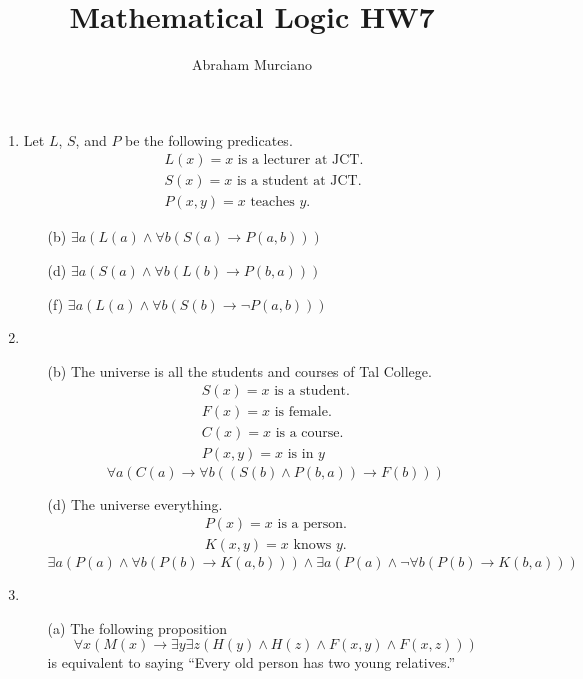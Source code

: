 \documentclass[fleqn]{article}
\title{Mathematical Logic HW7}
\author{Abraham Murciano}
\begin{document}
\maketitle

\begin{enumerate}

	\item %
	Let \(L\), \(S\), and \(P\) be the following predicates.
	\begin{gather*}
		L(x) = x \text{ is a lecturer at JCT.} \\
		S(x) = x \text{ is a student at JCT.} \\
		P(x, y) = x \text{ teaches \(y\).}
	\end{gather*}
	\begin{enumerate}
		\item[(b)]
		\(\exists a (L(a) \land \forall b (S(a) \to P(a, b)))\)

		\item[(d)]
		\(\exists a (S(a) \land \forall b (L(b) \to P(b, a)))\)

		\item[(f)]
		\(\exists a (L(a) \land \forall b (S(b) \to \lnot P(a, b)))\)
	\end{enumerate}

	\item %
	\begin{enumerate}
		\item[(b)]
		The universe is all the students and courses of Tal College.
		\begin{gather*}
			S(x) = x \text{ is a student.} \\
			F(x) = x \text{ is female.} \\
			C(x) = x \text{ is a course.} \\
			P(x, y) = x \text{ is in } y
		\end{gather*}
		\[\forall a (C(a) \to \forall b ((S(b) \land P(b, a)) \to F(b)))\]

		\item[(d)]
		The universe everything.
		\begin{gather*}
			P(x) = x \text{ is a person.} \\
			K(x, y) = x \text{ knows } y.
		\end{gather*}
		\[\exists a (P(a) \land \forall b (P(b) \to K(a, b))) \land \exists a (P(a) \land \lnot \forall b (P(b) \to K(b, a)))\]
	\end{enumerate}

	\item %
	\begin{enumerate}
		\item [(a)] 
		The following proposition
		\[\forall x (M(x) \to \exists y \exists z (H(y) \land H(z) \land F(x, y) \land F(x, z)))\]
		is equivalent to saying ``Every old person has two young relatives.''


\end{enumerate}
\end{enumerate}
\end{document}
